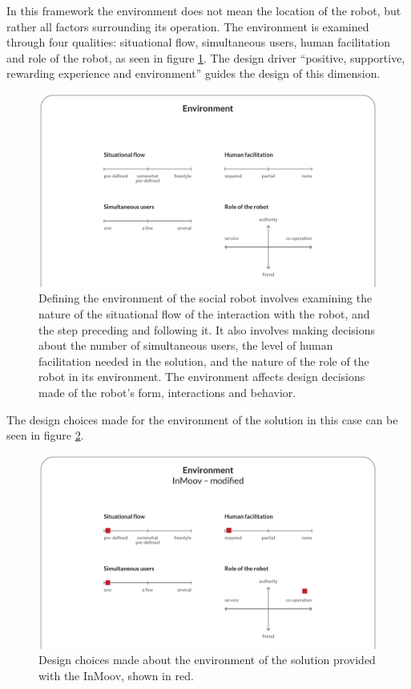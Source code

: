 \label{chapter:environment}
\label{sec:environments}

In this framework the environment does not mean the location of the robot, but rather all factors surrounding its operation. The environment is examined through four qualities: situational flow, simultaneous users, human facilitation and role of the robot, as seen in figure \ref{fig:environment}. The design driver ``positive, supportive, rewarding experience and environment'' guides the design of this dimension. 


 \begin{figure}
  \includegraphics[width=\linewidth]{images/solution_v4-02.pdf}
  \caption{Defining the environment of the social robot involves examining the nature of the situational flow of the interaction with the robot, and the step preceding and following it. It also involves making decisions about the number of simultaneous users, the level of human facilitation needed in the solution, and the nature of the role of the robot in its environment. The environment affects design decisions made of the robot's form, interactions and behavior.}
  \label{fig:environment}
\end{figure}

The design choices made for the environment of the solution in this case can be seen in figure \ref{fig:environmentFinal}.


\begin{figure}
  \includegraphics[width=\linewidth]{images/solution_inmoov_final-02.pdf}
  \caption{Design choices made about the environment of the solution provided with the InMoov, shown in red.}
  \label{fig:environmentFinal}
\end{figure}


